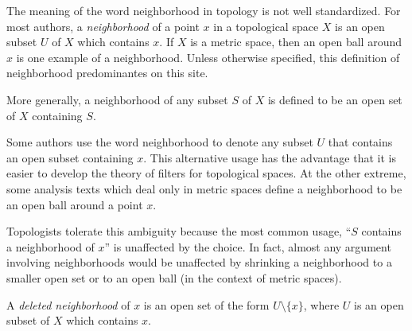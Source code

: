 \documentclass[12pt]{article}
\begin{document}
The meaning of the word neighborhood in topology is not well standardized. For most authors, a \emph{neighborhood} of a point $x$ in a topological space $X$ is an open subset $U$ of $X$ which contains $x$. If $X$ is a metric space, then an open ball around $x$ is one example of a neighborhood. Unless otherwise specified, this definition of neighborhood predominantes on this site.

More generally, a neighborhood of any subset $S$ of $X$ is defined to be an open set of $X$ containing $S$.

Some authors use the word neighborhood to denote any subset $U$ that contains an open subset containing $x$. This alternative usage has the advantage that it is easier to develop the theory of filters for topological spaces. At the other extreme, some analysis texts which deal only in metric spaces define a neighborhood to be an open ball around a point $x$.

Topologists tolerate this ambiguity because the most common usage, ``$S$ contains a neighborhood of $x$'' is unaffected by the choice.  In fact, almost any argument involving neighborhoods would be unaffected by shrinking a neighborhood to a smaller open set or to an open ball (in the context of metric spaces). 

A \emph{deleted neighborhood} of $x$ is an open set of the form $U \setminus \{x\}$, where $U$ is an open subset of $X$ which contains $x$.
\end{document}
